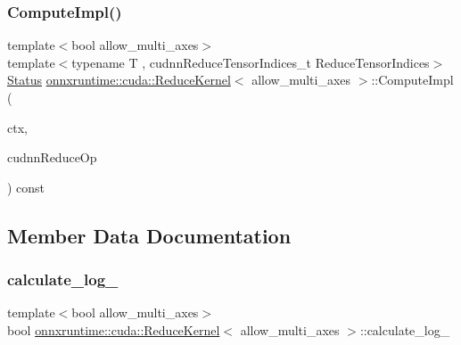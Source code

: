 \subsubsection{\texorpdfstring{Compute\+Impl()}{ComputeImpl()}}
{\footnotesize\ttfamily template$<$bool allow\+\_\+multi\+\_\+axes$>$ \\
template$<$typename T , cudnn\+Reduce\+Tensor\+Indices\+\_\+t Reduce\+Tensor\+Indices$>$ \\
\mbox{\hyperlink{classonnxruntime_1_1common_1_1Status}{Status}} \mbox{\hyperlink{classonnxruntime_1_1cuda_1_1ReduceKernel}{onnxruntime\+::cuda\+::\+Reduce\+Kernel}}$<$ allow\+\_\+multi\+\_\+axes $>$\+::Compute\+Impl (\begin{DoxyParamCaption}\item[{\mbox{\hyperlink{classonnxruntime_1_1OpKernelContext}{Op\+Kernel\+Context}} $\ast$}]{ctx,  }\item[{cudnn\+Reduce\+Tensor\+Op\+\_\+t}]{cudnn\+Reduce\+Op }\end{DoxyParamCaption}) const\hspace{0.3cm}{\ttfamily [protected]}}



\subsection{Member Data Documentation}
\mbox{\label{classonnxruntime_1_1cuda_1_1ReduceKernel_a548d3c1acc9c6cb71db58cb83bdd7074}} 
\subsubsection{\texorpdfstring{calculate\+\_\+log\+\_\+}{calculate\_log\_}}
{\footnotesize\ttfamily template$<$bool allow\+\_\+multi\+\_\+axes$>$ \\
bool \mbox{\hyperlink{classonnxruntime_1_1cuda_1_1ReduceKernel}{onnxruntime\+::cuda\+::\+Reduce\+Kernel}}$<$ allow\+\_\+multi\+\_\+axes $>$\+::calculate\+\_\+log\+\_\+\hspace{0.3cm}{\ttfamily [protected]}}

\mbox{\label{classonnxruntime_1_1cuda_1_1ReduceKernel_a69abc49b967b0436057b8ec592df23de}} 
